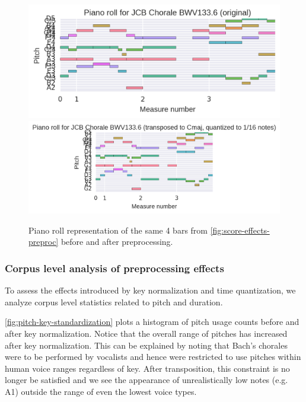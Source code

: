 \begin{figure}[htpb]
    \centering
        \includegraphics[width=1.0\linewidth]{bwv133-6-original-piano-roll.png}
        \includegraphics[width=1.0\linewidth]{bwv133-6-preproc-piano-roll.png}
    \caption{Piano roll representation of the same 4 bars from \cref{fig:score-effects-preproc}
    before and after preprocessing.}
    \label{fig:piano-roll-effects-preproc}
\end{figure}

\subsubsection{Corpus level analysis of preprocessing effects}

To assess the effects introduced by key normalization and time quantization,
we analyze corpus level statistics related to pitch and duration.

\cref{fig:pitch-key-standardization} plots a histogram of pitch usage counts
before and after key normalization. Notice that the overall range of pitches
has increased after key normalization. This can be explained by noting that
Bach's chorales were to be performed by vocalists and hence were restricted to
use pitches within human voice ranges regardless of key. After transposition,
this constraint is no longer be satisfied and we see the appearance of
unrealistically low notes (e.g. A1) outside the range of even the lowest voice
types.

